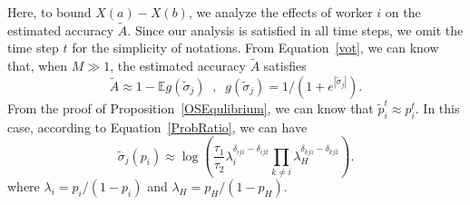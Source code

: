 \documentclass{article}
\begin{document}
%
%
%

Here, to bound $X(a)-X(b)$, we analyze the effects of worker $i$ on the estimated accuracy $\tilde{A}$.
Since our analysis is satisfied in all time steps, we omit the time step $t$ for the simplicity of notations.
From Equation~\ref{vot}, we can know that, when $M\gg 1$, the estimated accuracy $\tilde{A}$ satisfies
\begin{equation}
\label{accP}
\tilde{A} \approx 1-\mathbb{E}g(\tilde{\sigma}_j)\;\;,\;\; g(\tilde{\sigma}_j)=1/(1+e^{|\tilde{\sigma}_j|}).
\end{equation}
From the proof of Proposition~\ref{OSEqulibrium}, we can know that $\tilde{p}^{t}_i \approx p^{t}_i$.
In this case, according to Equation~\ref{ProbRatio}, we can have
\begin{equation}
\label{ProbRatioApp}
\tilde{\sigma}_j(p_i)\approx \log\left(\frac{\tau_{1}}{\tau_{2}}\lambda_i^{\delta_{ij1}-\delta_{ij2}}{\prod}_{k\neq i}\lambda_H^{\delta_{kj1}-\delta_{kj2}}\right).
\end{equation}
where $\lambda_i=p_i/(1-p_i)$ and $\lambda_H=p_H/(1-p_H)$.
\end{document}

